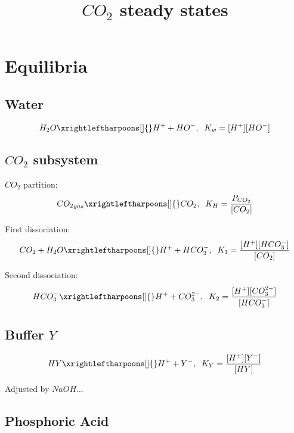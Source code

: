\documentclass[aps,12pt]{revtex4}
\begin{document}
\title{$CO_2$ steady states}
\maketitle

\section{Equilibria}

\subsection{Water}
\begin{equation}
\label{water}
  H_2O \xrightleftharpoons[]{} H^+ + HO^-, \;\; K_w = [H^+][HO^-]
\end{equation}

\subsection{$CO_2$ subsystem}

$CO_2$ partition:
\begin{equation}
\label{co2_part}
{CO_2}_{gas} \xrightleftharpoons[]{} CO_2, \;\; K_H = \dfrac{P_{CO_2}}{[CO_2]}
\end{equation}

First dissociation:
\begin{equation}
\label{eq1}
CO_2 + H_2O\xrightleftharpoons[]{}  H^+ + HCO_3^-,\;\; K_1 = \dfrac{[H^+][HCO_3^-]}{[CO_2]}
\end{equation}

Second dissociation:
\begin{equation}
\label{eq1}
 HCO_3^- \xrightleftharpoons[]{} H^+ + CO_3^{2-},\;\; K_2 = \dfrac{[H^+][CO_3^{2-}]}{[HCO_3^-]}
\end{equation}

\subsection{Buffer $Y$}

\begin{equation}
\label{buffer}
HY \xrightleftharpoons[]{} H^+ + Y^-, \;\; K_Y = \dfrac{[H^+][Y^-]}{[HY]}
\end{equation}

Adjusted by $NaOH$...

\subsection{Phosphoric Acid}
\end{document}
